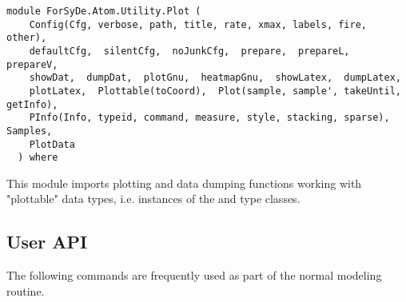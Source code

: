 \label{module:ForSyDe.Atom.Utility.Plot}
\haddockbeginheader
{\haddockverb\begin{verbatim}
module ForSyDe.Atom.Utility.Plot (
    Config(Cfg, verbose, path, title, rate, xmax, labels, fire, other), 
    defaultCfg,  silentCfg,  noJunkCfg,  prepare,  prepareL,  prepareV, 
    showDat,  dumpDat,  plotGnu,  heatmapGnu,  showLatex,  dumpLatex, 
    plotLatex,  Plottable(toCoord),  Plot(sample, sample', takeUntil, getInfo), 
    PInfo(Info, typeid, command, measure, style, stacking, sparse),  Samples, 
    PlotData
  ) where\end{verbatim}}
\haddockendheader

This module imports plotting and data dumping functions working
 with "plottable" data types, i.e. instances of the  and
  type classes.\par

\subsection{User API}
The following commands are frequently used as part of the
 normal modeling routine.\par

